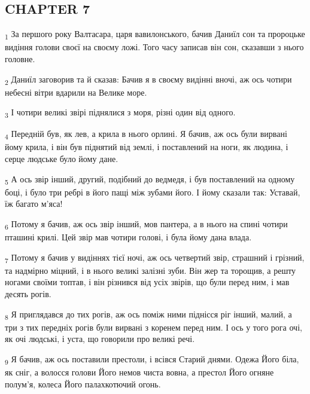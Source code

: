 \subsection{CHAPTER 7}
\begin{tcolorbox}
\textsubscript{1} За першого року Валтасара, царя вавилонського, бачив Даниїл сон та пророцьке видіння голови своєї на своєму ложі. Того часу записав він сон, сказавши з нього головне.
\end{tcolorbox}
\begin{tcolorbox}
\textsubscript{2} Даниїл заговорив та й сказав: Бачив я в своєму видінні вночі, аж ось чотири небесні вітри вдарили на Велике море.
\end{tcolorbox}
\begin{tcolorbox}
\textsubscript{3} І чотири великі звірі піднялися з моря, різні один від одного.
\end{tcolorbox}
\begin{tcolorbox}
\textsubscript{4} Передній був, як лев, а крила в нього орлині. Я бачив, аж ось були вирвані йому крила, і він був піднятий від землі, і поставлений на ноги, як людина, і серце людське було йому дане.
\end{tcolorbox}
\begin{tcolorbox}
\textsubscript{5} А ось звір інший, другий, подібний до ведмедя, і був поставлений на одному боці, і було три ребрі в його пащі між зубами його. І йому сказали так: Уставай, їж багато м'яса!
\end{tcolorbox}
\begin{tcolorbox}
\textsubscript{6} Потому я бачив, аж ось звір інший, мов пантера, а в нього на спині чотири пташині крилі. Цей звір мав чотири голові, і була йому дана влада.
\end{tcolorbox}
\begin{tcolorbox}
\textsubscript{7} Потому я бачив у видіннях тієї ночі, аж ось четвертий звір, страшний і грізний, та надмірно міцний, і в нього великі залізні зуби. Він жер та торощив, а решту ногами своїми топтав, і він різнився від усіх звірів, що були перед ним, і мав десять рогів.
\end{tcolorbox}
\begin{tcolorbox}
\textsubscript{8} Я приглядався до тих рогів, аж ось поміж ними піднісся ріг інший, малий, а три з тих передніх рогів були вирвані з коренем перед ним. І ось у того рога очі, як очі людські, і уста, що говорили про великі речі.
\end{tcolorbox}
\begin{tcolorbox}
\textsubscript{9} Я бачив, аж ось поставили престоли, і всівся Старий днями. Одежа Його біла, як сніг, а волосся голови Його немов чиста вовна, а престол Його огняне полум'я, колеса Його палахкотючий огонь.
\end{tcolorbox}
